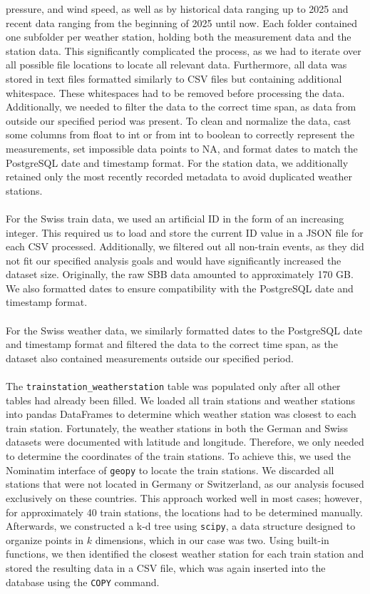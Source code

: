 pressure, and wind speed,
as well as by historical data ranging up to 2025
and recent data ranging from the beginning of 2025 until now.
Each folder contained one subfolder per weather station,
holding both the measurement data and the station data.
This significantly complicated the process,
as we had to iterate over all possible file locations
to locate all relevant data.
Furthermore, all data was stored in text files
formatted similarly to CSV files
but containing additional whitespace.
These whitespaces had to be removed
before processing the data.
Additionally, we needed to filter the data
to the correct time span,
as data from outside our specified period was present.
To clean and normalize the data,
cast some columns from float to int
or from int to boolean
to correctly represent the measurements,
set impossible data points to NA,
and format dates to match the PostgreSQL
date and timestamp format.
For the station data,
we additionally retained only the most recently recorded metadata
to avoid duplicated weather stations.\\\\
For the Swiss train data, we used an artificial ID
in the form of an increasing integer.
This required us to load and store the current ID value
in a JSON file for each CSV processed.
Additionally, we filtered out all non-train events,
as they did not fit our specified analysis goals
and would have significantly increased the dataset size.
Originally, the raw SBB data amounted to approximately 170 GB.
We also formatted dates to ensure compatibility
with the PostgreSQL date and timestamp format.\\\\
For the Swiss weather data,
we similarly formatted dates to the PostgreSQL
date and timestamp format
and filtered the data to the correct time span,
as the dataset also contained measurements
outside our specified period.\\\\
The \texttt{trainstation\_weatherstation} table
was populated only after all other tables
had already been filled.
We loaded all train stations and weather stations
into pandas DataFrames
to determine which weather station
was closest to each train station.
Fortunately, the weather stations
in both the German and Swiss datasets
were documented with latitude and longitude.
Therefore, we only needed to determine
the coordinates of the train stations.
To achieve this, we used the Nominatim interface \cite{nominatim} of \texttt{geopy}
to locate the train stations.
We discarded all stations
that were not located in Germany or Switzerland,
as our analysis focused exclusively on these countries.
This approach worked well in most cases;
however, for approximately 40 train stations,
the locations had to be determined manually.
Afterwards, we constructed a k-d tree \cite{scipy_kdtree} using \texttt{scipy},
a data structure designed to organize points
in $k$ dimensions, which in our case was two.
Using built-in functions,
we then identified the closest weather station
for each train station
and stored the resulting data in a CSV file,
which was again inserted into the database
using the \texttt{COPY} command. \cite{chatgpt_spellcheck}
